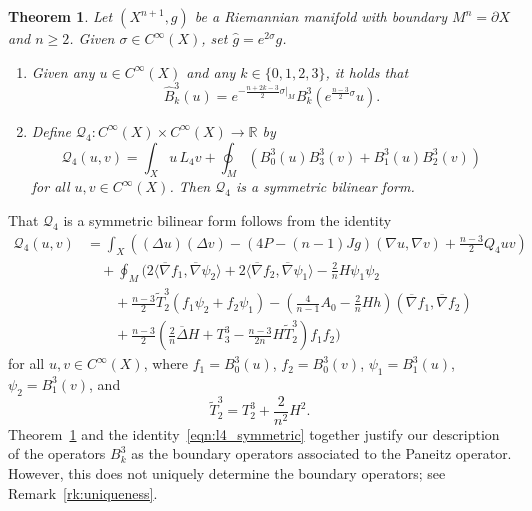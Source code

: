 \documentclass{amsart}
\newtheorem{thm}{Theorem}[section]
\theoremstyle{definition}
\theoremstyle{remark}
\numberwithin{equation}{section}
\begin{document}
\begin{thm}
 \label{thm:boundary}
 Let $(X^{n+1},g)$ be a Riemannian manifold with boundary $M^n=\partial X$ and $n\geq2$.  Given $\sigma\in C^\infty(X)$, set ${\widehat{g}}=e^{2\sigma}g$.
 \begin{enumerate}
  \item Given any $u\in C^\infty(X)$ and any $k\in\{0,1,2,3\}$, it holds that
  \[ {\widehat{B}}_k^3(u) = e^{-\frac{n+2k-3}{2}\sigma{\rvert}_M}B_k^3\left(e^{\frac{n-3}{2}\sigma}u\right) . \]
  \item Define ${\mathcal{Q}}_4\colon C^\infty(X)\times C^\infty(X)\to{\mathbb{R}}$ by
  \[ {\mathcal{Q}}_4(u,v) = \int_X u\,L_4v + \oint_M \left( B_0^3(u)B_3^3(v) + B_1^3(u)B_2^3(v)\right) \]
  for all $u,v\in C^\infty(X)$.  Then ${\mathcal{Q}}_4$ is a symmetric bilinear form.
 \end{enumerate}
\end{thm}

That ${\mathcal{Q}}_4$ is a symmetric bilinear form follows from the identity
\begin{equation}
 \label{eqn:l4_symmetric}
 \begin{split}
  {\mathcal{Q}}_4(u,v) & = \int_X \left((\Delta u)(\Delta v) - (4P-(n-1)Jg)(\nabla u,\nabla v) + \frac{n-3}{2}Q_4uv\right) \\
  & \quad + \oint_M\biggl( 2{\langle}{\overline{\nabla}} f_1,{\overline{\nabla}}\psi_2{\rangle} + 2{\langle}{\overline{\nabla}} f_2,{\overline{\nabla}}\psi_1{\rangle} - \frac{2}{n}H\psi_1\psi_2 \\
   & \qquad + \frac{n-3}{2}{\widetilde{T}}_2^3\left(f_1\psi_2+f_2\psi_1\right) - \left(\frac{4}{n-1}A_0-\frac{2}{n}Hh\right)({\overline{\nabla}} f_1,{\overline{\nabla}} f_2) \\
   & \qquad + \frac{n-3}{2}\left(\frac{2}{n}{\overline{\Delta}} H + T_3^3 - \frac{n-3}{2n}H{\widetilde{T}}_2^3\right)f_1f_2\biggr)
 \end{split}
\end{equation}
for all $u,v\in C^\infty(X)$, where $f_1=B_0^3(u)$, $f_2=B_0^3(v)$, $\psi_1=B_1^3(u)$, $\psi_2=B_1^3(v)$, and
\[ {\widetilde{T}}_2^3=T_2^3+\frac{2}{n^2}H^2 . \]
Theorem~\ref{thm:boundary} and the identity~\eqref{eqn:l4_symmetric} together justify our description of the operators $B_k^3$ as the boundary operators associated to the Paneitz operator.  However, this does not uniquely determine the boundary operators; see Remark~\ref{rk:uniqueness}.
\end{document}
